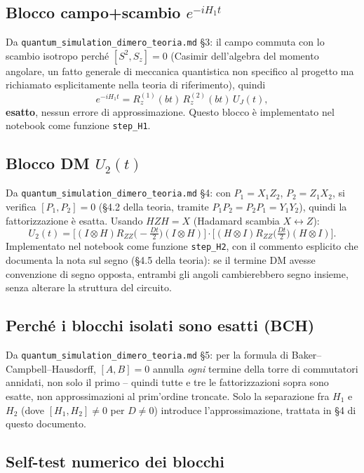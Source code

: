 \documentclass[11pt,a4paper]{article}
\begin{document}
\subsection{Blocco campo+scambio $e^{-iH_1t}$}

Da \texttt{quantum\_simulation\_dimero\_teoria.md} \S3: il campo commuta con
lo scambio isotropo perché $[S^2,S_z]=0$ (Casimir dell'algebra del momento
angolare, un fatto generale di meccanica quantistica non specifico al
progetto ma richiamato esplicitamente nella teoria di riferimento), quindi
$$e^{-iH_1t} = R_z^{(1)}(bt)\,R_z^{(2)}(bt)\,U_J(t),$$
\textbf{esatto}, nessun errore di approssimazione. Questo blocco è
implementato nel notebook come funzione \texttt{step\_H1}.

\subsection{Blocco DM $U_2(t)$}

Da \texttt{quantum\_simulation\_dimero\_teoria.md} \S4: con $P_1=X_1Z_2$,
$P_2=Z_1X_2$, si verifica $[P_1,P_2]=0$ (§4.2 della teoria, tramite
$P_1P_2=P_2P_1=Y_1Y_2$), quindi la fattorizzazione è esatta. Usando
$HZH=X$ (Hadamard scambia $X\leftrightarrow Z$):
$$U_2(t) = \Big[(I\otimes H)R_{ZZ}\!\big(-\tfrac{Dt}{2}\big)(I\otimes H)\Big]\cdot\Big[(H\otimes I)R_{ZZ}\!\big(\tfrac{Dt}{2}\big)(H\otimes I)\Big].$$
Implementato nel notebook come funzione \texttt{step\_H2}, con il commento
esplicito che documenta la nota sul segno (\S4.5 della teoria): se il
termine DM avesse convenzione di segno opposta, entrambi gli angoli
cambierebbero segno insieme, senza alterare la struttura del circuito.

\subsection{Perché i blocchi isolati sono esatti (BCH)}

Da \texttt{quantum\_simulation\_dimero\_teoria.md} \S5: per la formula di
Baker--Campbell--Hausdorff, $[A,B]=0$ annulla \emph{ogni} termine della
torre di commutatori annidati, non solo il primo -- quindi tutte e tre le
fattorizzazioni sopra sono esatte, non approssimazioni al prim'ordine
troncate. Solo la separazione fra $H_1$ e $H_2$ (dove
$[H_1,H_2]\neq0$ per $D\neq0$) introduce l'approssimazione, trattata in
\S4 di questo documento.

\subsection{Self-test numerico dei blocchi}
\end{document}
